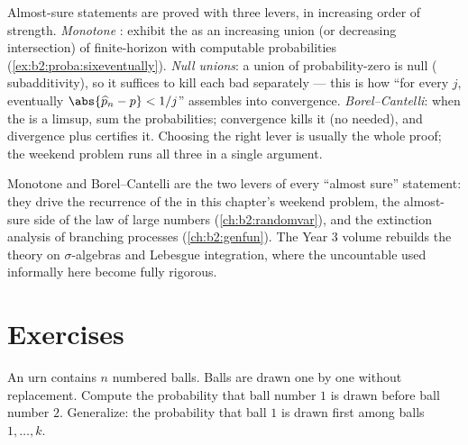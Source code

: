 \begin{remark}
Almost-sure statements are proved with three levers, in
increasing order of strength. \emph{Monotone }:
exhibit the  as an increasing union (or decreasing
intersection) of finite-horizon  with computable
probabilities (\cref{ex:b2:proba:sixeventually}).
\emph{Null unions}: a  union of probability-zero
 is null ( subadditivity), so it suffices to
kill each bad  separately --- this is how ``for every
$j$, eventually $\abs{\widehat p_n - p} < 1/j$'' assembles
into convergence. \emph{Borel--Cantelli}: when the  is a
limsup, sum the probabilities; convergence kills it
(no  needed), and divergence plus 
certifies it. Choosing the right lever is usually the whole
proof; the weekend problem runs all three in a single
argument.
\end{remark}

\begin{remark}
Monotone  and Borel--Cantelli are the two levers of
every ``almost sure'' statement: they drive the recurrence of
the  in this chapter's weekend problem, the
almost-sure side of the law of large numbers
(\cref{ch:b2:randomvar}), and the extinction analysis of
branching processes (\cref{ch:b2:genfun}). The Year 3 volume
rebuilds the theory on $\sigma$-algebras and Lebesgue
integration, where the uncountable  used
informally here become fully rigorous.
\end{remark}

\section{Exercises}

\begin{exercise}[$\star$]\label{exo:b2:proba:1}
An urn contains $n$ numbered balls. Balls are drawn one by one
without replacement. Compute the probability that ball number $1$
is drawn before ball number $2$. Generalize: the probability that
ball $1$ is drawn first among balls $1, \dots, k$.
\end{exercise}

